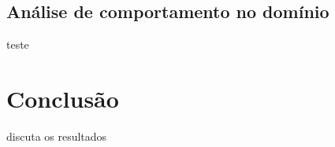 \documentclass[letterpaper]{article}
\begin{document}
\subsection{Análise de comportamento no domínio}

teste

\section{Conclusão}
discuta os resultados



\end{document}
